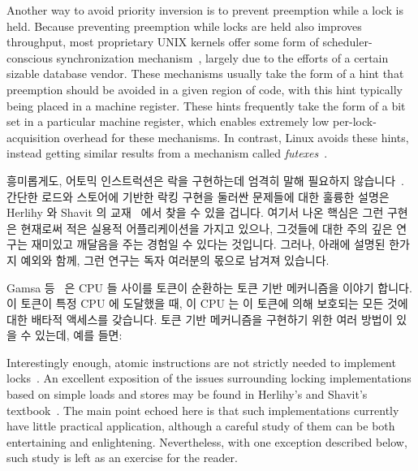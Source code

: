 Another way to avoid priority inversion is to prevent preemption
while a lock is held.
Because preventing preemption while locks are held also improves throughput,
most proprietary UNIX kernels offer some form of scheduler-conscious
synchronization mechanism~\cite{Kontothanassis97a},
largely due to the efforts of a certain sizable database vendor.
These mechanisms usually take the form of a hint that preemption
should be avoided in a given region of code, with this hint typically
being placed in a machine register.
These hints frequently take the form of a bit set in a particular
machine register, which enables extremely low per-lock-acquisition overhead
for these mechanisms.
In contrast, Linux avoids these hints, instead getting
similar results from a mechanism called
\emph{futexes}~\cite{HubertusFrancke2002Futex,IngoMolnar2006RobustFutexes,StevenRostedt2006piFutexes,UlrichDrepper2011Futexes}.

\fi

흥미롭게도, 어토믹 인스트럭션은 락을 구현하는데 엄격히 말해 필요하지
않습니다~\cite{Dijkstra65a,Lamport74a}.
간단한 로드와 스토어에 기반한 락킹 구현을 둘러싼 문제들에 대한 훌륭한 설명은
Herlihy 와 Shavit 의
교재~\cite{HerlihyShavit2008Textbook,HerlihyShavit2020Textbook} 에서 찾을 수
있을 겁니다.
여기서 나온 핵심은 그런 구현은 현재로써 적은 실용적 어플리케이션을 가지고
있으나, 그것들에 대한 주의 깊은 연구는 재미있고 깨달음을 주는 경험일 수 있다는
것입니다.
그러나, 아래에 설명된 한가지 예외와 함께, 그런 연구는 독자 여러분의 몫으로
남겨져 있습니다.

Gamsa 등~\cite[Section 5.3]{Gamsa99} 은 CPU 들 사이를 토큰이 순환하는 토큰 기반
메커니즘을 이야기 합니다.
이 토큰이 특정 CPU 에 도달했을 때, 이 CPU 는 이 토큰에 의해 보호되는 모든 것에
대한 배타적 액세스를 갖습니다.
토큰 기반 메커니즘을 구현하기 위한 여러 방법이 있을 수 있는데, 예를 들면:

\iffalse

Interestingly enough, atomic instructions are not strictly needed to
implement locks~\cite{Dijkstra65a,Lamport74a}.
An excellent exposition of the issues surrounding locking implementations
based on simple loads and stores may be found in Herlihy's and
Shavit's textbook~\cite{HerlihyShavit2008Textbook,HerlihyShavit2020Textbook}.
The main point echoed here is that such implementations currently
have little practical application, although a careful study of
them can be both entertaining and enlightening.
Nevertheless, with one exception described below, such study is left
as an exercise for the reader.

